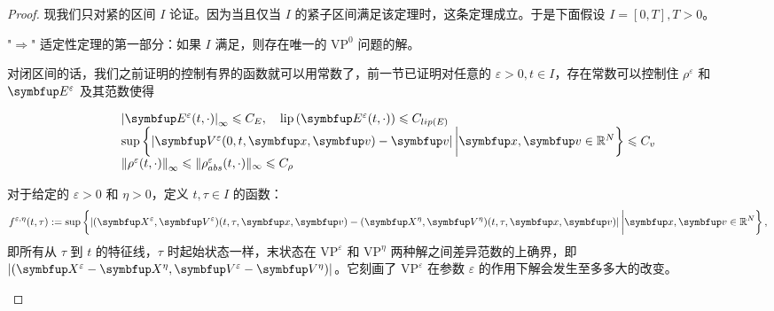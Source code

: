 \begin{proof}
    

现我们只对紧的区间 $I$ 论证。因为当且仅当 $I$ 的紧子区间满足该定理时，这条定理成立。于是下面假设 $I=[0, T], T>0$。

"$\Rightarrow$" 适定性定理的第一部分：如果 $I$ 满足\boundcondition，则存在唯一的 $\text{VP}^{0}$ 问题的解。

对闭区间的话，我们之前证明的控制有界的函数就可以用常数了，前一节已证明对任意的 $\varepsilon>0, t \in I$，存在常数可以控制住 $\rho^\varepsilon$ 和 $\vE^\varepsilon$ 及其范数使得

\[
\begin{array}{l}
\left|\vE^{\varepsilon}(t, \cdot)\right|_{\infty} \leqslant C_{E}, \quad \operatorname{lip}\left(\vE^{\varepsilon}(t, \cdot)\right) \leqslant C_{lip(E)} \\
\sup \left\{\left|\vect{V}^{\varepsilon}(0, t, \vx, \vv)-\vv\right| \bigg|\vx, \vv\in \bbR^{N}\right\} \leqslant C_{v} \\
\left\|\rho^{\varepsilon}(t, \cdot)\right\|_{\infty} \leqslant \| \rho^{\varepsilon}_{abs}(t, \cdot)\|_{\infty} \leqslant C_\rho%
\end{array}
\]



\begin{definition}
对于给定的 $\varepsilon>0$ 和 $\eta>0$，定义 $t, \tau \in I$ 的函数：
\[
f^{\varepsilon, \eta}(t, \tau):=\sup \left\{\left|(\vect{X}^{\varepsilon},\vect{V}^{\varepsilon})(t, \tau, \vx, \vv)-(\vect{X}^{\eta},\vect{V}^{\eta})(t, \tau, \vx, \vv)\right| \bigg|\vx, \vv\in \bbR^{N}\right\},
\]
即所有从 $\tau$ 到 $t$ 的特征线，$\tau$ 时起始状态一样，末状态在 $\text{VP}^\varepsilon$ 和 $\text{VP}^\eta$ 两种解之间差异范数的上确界，即 $|(\vect{X}^\varepsilon - \vect{X}^\eta, \vect{V}^\varepsilon-\vect{V}^\eta)|$。它刻画了 $\text{VP}^\varepsilon$ 在参数 $\varepsilon$ 的作用下解会发生至多多大的改变。 
\end{definition} 


\end{proof}
